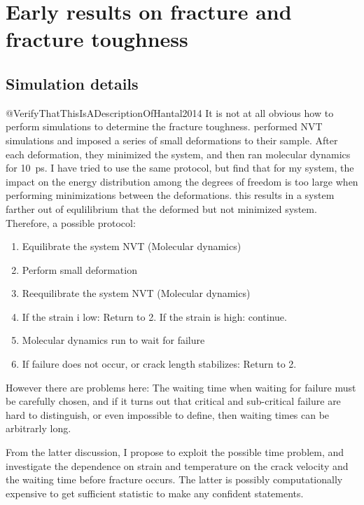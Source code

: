 \section{Early results on fracture and fracture toughness}



\subsection{Simulation details}
@VerifyThatThisIsADescriptionOfHantal2014
It is not at all obvious how to perform simulations to determine the fracture toughness. \citet{Hantal2014} performed NVT simulations and imposed a series of small deformations to their sample. After each deformation, they minimized the system, and then ran molecular dynamics for \SI{10}{\pico\second}. I have tried to use the same protocol, but find that for my system, the impact on the energy distribution among the degrees of freedom is too large when performing minimizations between the deformations. this results in a system farther out of equlilibrium that the deformed but not minimized system. Therefore, a possible protocol:

\begin{enumerate}
\item Equilibrate the system NVT (Molecular dynamics)
\item Perform small deformation
\item Reequilibrate the system NVT (Molecular dynamics)
\item If the strain i low: Return to 2. If the strain is high: continue.
\item Molecular dynamics run to wait for failure
\item If failure does not occur, or crack length stabilizes: Return to 2. 
\end{enumerate}

However there are problems here: The waiting time when waiting for failure must be carefully chosen, and if it turns out that critical and sub-critical failure are hard to distinguish, or even impossible to define, then waiting times can be arbitrarly long. 

From the latter discussion, I propose to exploit the possible time problem, and investigate the dependence on strain and temperature on the crack velocity and the waiting time before fracture occurs. The latter is possibly computationally expensive to get sufficient statistic to make any confident statements. 

